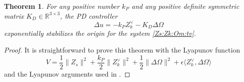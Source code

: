 \documentclass[letterpaper, 10 pt, conference]{ieeeconf}  %
\newtheorem{theorem}{Theorem}[section]
\begin{document}

\begin{theorem}\label{theorem:delta:3}
For any positive number $k_P$ and any positive definite symmetric matrix $K_D \in \mathbb R^{3\times 3}$, the PD controller
\begin{equation}\label{delta:u:kpd}
\Delta u = -k_PZ_k^\vee - K_D \Delta \Omega
\end{equation}
exponentially stabilizes the origin for the  system \eqref{Zs:Zk:Om:tv}. 
\end{theorem}
\begin{proof}
It is straightforward to prove this theorem with the Lyapunov function
\[
V = \frac{1}{2}\|Z_s\|^2 + \frac{k_P}{2} \|Z_k^\vee\|^2 + \frac{1}{2}\|\Delta \Omega\|^2 + \epsilon \langle Z_k^\vee,\Delta  \Omega  \rangle
\]
and the Lyapunov arguments used in \cite{LeLeMc13}. 
\end{proof}
\end{document}
